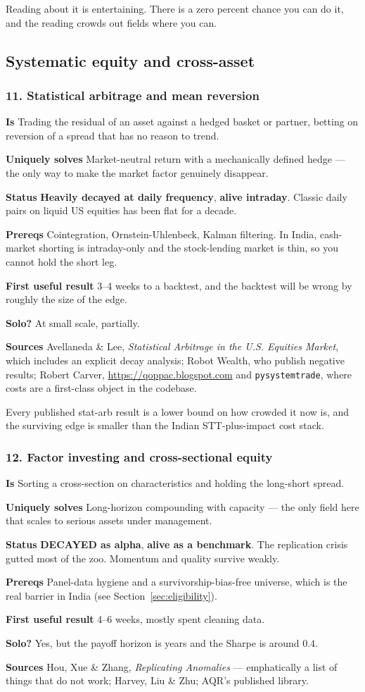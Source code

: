 \documentclass[11pt,a4paper]{article}
\newcommand{\alv}[1]{\textcolor{alive}{\textbf{#1}}}
\newcommand{\dec}[1]{\textcolor{decayed}{\textbf{#1}}}
\newcommand{\fitem}[1]{\par\smallskip\noindent\textbf{#1} }
\begin{document}
\begin{waste}
Reading about it is entertaining. There is a zero percent chance you can do it,
and the reading crowds out fields where you can.
\end{waste}

\subsection{Systematic equity and cross-asset}

\subsubsection{11. Statistical arbitrage and mean reversion}
\fitem{Is}Trading the residual of an asset against a hedged basket or partner,
betting on reversion of a spread that has no reason to trend.
\fitem{Uniquely solves}Market-neutral return with a mechanically defined hedge
--- the only way to make the market factor genuinely disappear.
\fitem{Status}\dec{Heavily decayed at daily frequency}, \alv{alive intraday}.
Classic daily pairs on liquid US equities has been flat for a decade.
\fitem{Prereqs}Cointegration, Ornstein-Uhlenbeck, Kalman filtering. In India,
cash-market shorting is intraday-only and the stock-lending market is thin, so
you cannot hold the short leg.
\fitem{First useful result}3--4 weeks to a backtest, and the backtest will be
wrong by roughly the size of the edge.
\fitem{Solo?}At small scale, partially.
\fitem{Sources}Avellaneda \& Lee, \emph{Statistical Arbitrage in the U.S.
Equities Market}, which includes an explicit decay analysis; Robot Wealth, who
publish negative results; Robert Carver, \url{https://qoppac.blogspot.com} and
\texttt{pysystemtrade}, where costs are a first-class object in the codebase.

\begin{waste}
Every published stat-arb result is a lower bound on how crowded it now is, and
the surviving edge is smaller than the Indian STT-plus-impact cost stack.
\end{waste}

\subsubsection{12. Factor investing and cross-sectional equity}
\fitem{Is}Sorting a cross-section on characteristics and holding the long-short
spread.
\fitem{Uniquely solves}Long-horizon compounding with capacity --- the only field
here that scales to serious assets under management.
\fitem{Status}\dec{DECAYED as alpha}, \alv{alive as a benchmark}. The
replication crisis gutted most of the zoo. Momentum and quality survive weakly.
\fitem{Prereqs}Panel-data hygiene and a survivorship-bias-free universe, which is
the real barrier in India (see Section~\ref{sec:eligibility}).
\fitem{First useful result}4--6 weeks, mostly spent cleaning data.
\fitem{Solo?}Yes, but the payoff horizon is years and the Sharpe is around 0.4.
\fitem{Sources}Hou, Xue \& Zhang, \emph{Replicating Anomalies} --- emphatically a
list of things that do not work; Harvey, Liu \& Zhu; AQR's published library.
\end{document}
